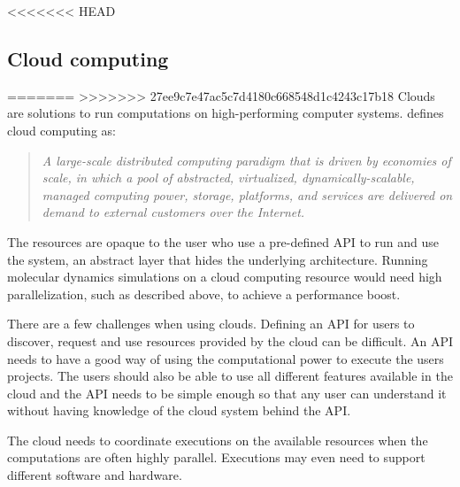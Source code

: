 

<<<<<<< HEAD

\subsection{Cloud computing}
=======
>>>>>>> 27ee9c7e47ac5c7d4180c668548d1c4243c17b18
Clouds are solutions to run computations on high-performing computer
systems. \citet{foster:2008} defines cloud computing as:

\begin{quote} \slshape
  A large-scale distributed computing paradigm that is driven by
  economies of scale, in which a pool of abstracted, virtualized,
  dynamically-scalable, managed computing power, storage, platforms,
  and services are delivered on demand to external customers over
  the Internet.
\end{quote}

The resources are opaque to the user who use a pre-defined API to run
and use the system, an abstract layer that hides the underlying
architecture. Running molecular dynamics simulations on a cloud
computing resource would need high parallelization, such as described
above, to achieve a performance boost.



There are a few challenges when using clouds. Defining an API for
users to discover, request and use resources provided by the cloud can
be difficult. An API needs to have a good way of using the
computational power to execute the users projects. The users should
also be able to use all different features available in the cloud and
the API needs to be simple enough so that any user can understand it
without having knowledge of the cloud system behind the API.

The cloud needs to coordinate executions on the available resources
when the computations are often highly parallel. Executions may even
need to support different software and hardware.

